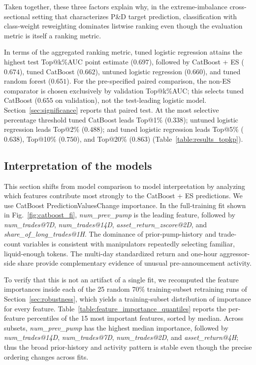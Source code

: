 \documentclass{ieeeaccess}
\begin{document}
Taken together, these three factors explain why, in the extreme-imbalance cross-sectional setting that characterizes P\&D target prediction, classification with class-weight reweighting dominates listwise ranking even though the evaluation metric is itself a ranking metric.

In terms of the aggregated ranking metric, tuned logistic regression attains the highest test Top@k\%AUC point estimate ($0.697$), followed by CatBoost + ES ($0.674$), tuned CatBoost ($0.662$), untuned logistic regression ($0.660$), and tuned random forest ($0.651$). For the pre-specified paired comparison, the non-ES comparator is chosen exclusively by validation Top@k\%AUC; this selects tuned CatBoost ($0.655$ on validation), not the test-leading logistic model. Section~\ref{sec:significance} reports that paired test. At the most selective percentage threshold tuned CatBoost leads Top@1\% ($0.338$); untuned logistic regression leads Top@2\% ($0.488$); and tuned logistic regression leads Top@5\% ($0.638$), Top@10\% ($0.750$), and Top@20\% ($0.863$) (Table~\ref{table:results_topkp}).

\subsection{Interpretation of the models}

This section shifts from model comparison to model interpretation by analyzing which features contribute most strongly to the CatBoost + ES predictions. We use CatBoost PredictionValuesChange importance. In the full-training fit shown in Fig.~\ref{fig:catboost_fi}, \textit{num\_prev\_pump} is the leading feature, followed by \textit{num\_trades@7D}, \textit{num\_trades@14D}, \textit{asset\_return\_zscore@2D}, and \textit{share\_of\_long\_trades@1H}. The dominance of prior-pump-history and trade-count variables is consistent with manipulators repeatedly selecting familiar, liquid-enough tokens. The multi-day standardized return and one-hour aggressor-side share provide complementary evidence of unusual pre-announcement activity.

To verify that this is not an artifact of a single fit, we recomputed the feature importances inside each of the 25 random 70\% training-subset retraining runs of Section~\ref{sec:robustness}, which yields a training-subset distribution of importance for every feature. Table~\ref{table:feature_importance_quantiles} reports the per-feature percentiles of the 15 most important features, sorted by median. Across subsets, \textit{num\_prev\_pump} has the highest median importance, followed by \textit{num\_trades@14D}, \textit{num\_trades@7D}, \textit{num\_trades@2D}, and \textit{asset\_return@4H}; thus the broad prior-history and activity pattern is stable even though the precise ordering changes across fits.
\end{document}
